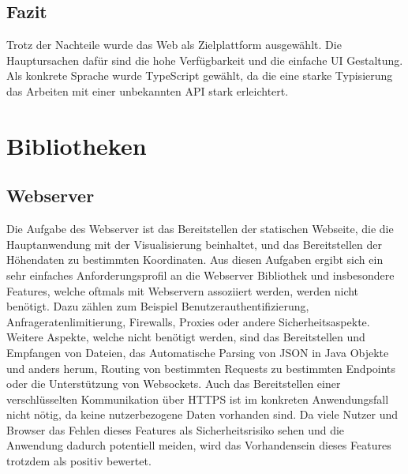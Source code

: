 
\subsection{Fazit}
Trotz der Nachteile wurde das Web als Zielplattform ausgewählt. Die Hauptursachen dafür sind die hohe Verfügbarkeit und die einfache UI Gestaltung. Als konkrete Sprache wurde TypeScript gewählt, da die eine starke Typisierung das Arbeiten mit einer unbekannten API stark erleichtert.


\section{Bibliotheken}

\subsection{Webserver}
Die Aufgabe des Webserver ist das Bereitstellen der statischen Webseite, die die Hauptanwendung mit der Visualisierung beinhaltet, und das Bereitstellen der Höhendaten zu bestimmten Koordinaten. Aus diesen Aufgaben ergibt sich ein sehr einfaches Anforderungsprofil an die Webserver Bibliothek und insbesondere Features, welche oftmals mit Webservern assoziiert werden, werden nicht benötigt. Dazu zählen zum Beispiel Benutzerauthentifizierung, Anfrageratenlimitierung, Firewalls, Proxies oder andere Sicherheitsaspekte. Weitere Aspekte, welche nicht benötigt werden, sind das Bereitstellen und Empfangen von Dateien, das Automatische Parsing von JSON in Java Objekte und anders herum, Routing von bestimmten Requests zu bestimmten Endpoints oder die Unterstützung von Websockets. Auch das Bereitstellen einer verschlüsselten Kommunikation über HTTPS ist im konkreten Anwendungsfall nicht nötig, da keine nutzerbezogene Daten vorhanden sind. Da viele Nutzer und Browser das Fehlen dieses Features als Sicherheitsrisiko sehen und die Anwendung dadurch potentiell meiden, wird das Vorhandensein dieses Features trotzdem als positiv bewertet.

